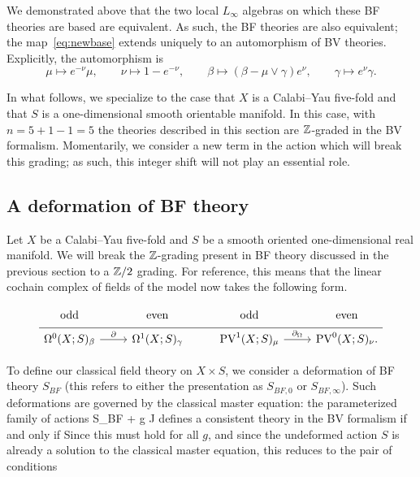 We demonstrated above that the two local $L_\infty$ algebras on which these BF theories are based are equivalent. As such, the BF theories are also equivalent; the map~\eqref{eq:newbase} extends uniquely to an automorphism of BV theories.
Explicitly, the automorphism is
\begin{equation}\label{eqn:auto1}
  \mu \mapsto e^{-\nu} \mu, \qquad \nu \mapsto 1-e^{-\nu} , \qquad
  \beta \mapsto (\beta - \mu \vee \gamma) e^{\nu},\qquad \gamma \mapsto e^{\nu} \gamma .
\end{equation}

\parsec[]

In what follows, we specialize to the case that $X$ is a Calabi--Yau five-fold and that $S$ is a one-dimensional smooth orientable manifold. 
In this case, with $n = 5 + 1 - 1 = 5$ the theories described in this section are $\mathbb Z$-graded in the BV formalism.
Momentarily, we consider a new term in the action which will break this grading; as such, this integer shift will not play an essential role.

\subsection{A deformation of BF theory} 

Let $X$ be a Calabi--Yau five-fold and $S$ be a smooth oriented one-dimensional real manifold. 
We will break the $\mathbb Z$-grading present in BF theory discussed in the previous section to a $\mathbb Z/2$ grading. 
For reference, this means that the linear cochain complex of fields of the model now takes the following form. 

\begin{equation}
  \label{eq:sympfields} 
  \begin{tikzcd}[row sep = 1 ex]
    {\rm odd} & {\rm even} & {\rm odd} & {\rm even} \\ \hline
    \Omega^{0}(X;S)_\beta \ar[r, "\del"] & \Omega^{1}(X;S)_\gamma & 
     \PV^{1}(X; S)_\mu \ar[r, "\div"] & \PV^{0}(X; S)_\nu.
\end{tikzcd}
\end{equation}

\parsec

To define our classical field theory on $X \times S$, we consider  a deformation of BF theory $S_{BF}$ (this refers to either the presentation as $S_{BF,0}$ or $S_{BF,\infty}$). 
Such deformations are governed by the classical master equation: the parameterized family of actions 
\beqn\label{eqn:defaction}
S_{BF} + g J
\eeqn
defines a consistent theory in the BV formalism if and only if
Since this must hold for all $g$, and since the undeformed action $S$ is already a solution to the classical master equation, this reduces to the pair of conditions


